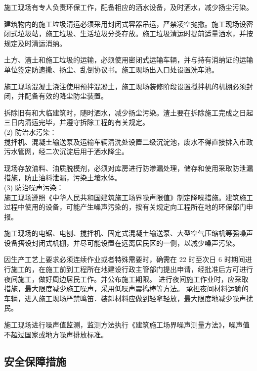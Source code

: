  施工现场有专人负责环保工作，配备相应的洒水设备，及时洒水，减少扬尘污染。  

 建筑物内的施工垃圾清运必须采用封闭式容器吊运，严禁凌空抛撒。施工现场设密闭式垃圾站，施工垃圾、生活垃圾分类存放。施工垃圾清运时提前适量洒水，并按规定及时清运消纳。  

 土方、渣土和施工垃圾的运输，必须使用密闭式运输车辆，并与持有消纳证的运输单位签定防遗撒、扬尘、乱倒协议书。施工现场出入口处设置洗车池。  

 施工现场混凝土浇注使用预拌混凝土，施工现场装修阶段设置搅拌机的机棚必须封闭，并配备有效的降尘防尘装置。  

 拆除旧有和大临建筑时，随时洒水，减少扬尘污染。渣土要在拆除施工完成之日起三日内清运完毕，并遵守拆除工程的有关规定。  \\

(2) 防治水污染：\\

 搅拌机、混凝土输送泵及运输车辆清洗处设置二级沉淀池，废水不得直接排入市政污水管网，经二次沉淀后用于洒水降尘。  

 现场存放油料、油质脱模剂，必须对库房进行防渗漏处理，储存和使用采取防泄漏措施，防止油料泄漏，污染土壤水体。\\

(3) 防治噪声污染：\\

 施工现场遵照《中华人民共和国建筑施工场界噪声限值》制定降噪措施。建筑施工过程中使用的设备，可能产生噪声污染的，按有关规定向工程所在地的环保部门申报。  

 施工现场的电锯、电刨、搅拌机、固定式混凝土输送泵、大型空气压缩机等强噪声设备搭设封闭式机棚，并尽可能设置在远离居民区的一侧，以减少噪声污染。  

 因生产工艺上要求必须连续作业或者特殊需要时，确需在 22 时至次日 6 时期间进行施工的，在施工前到工程所在地建设行政主管部门提出申请，经批准后方可进行夜间施工，做好周边居民工作。并公布施工期限。  进行夜间施工作业时，应采取措施，最大限度减少施工噪声，采用低噪声震捣棒等方法。
承担夜间材料运输的车辆，进入施工现场严禁鸣笛．装卸材料应做到轻拿轻放，最大限度地减少噪声扰民。  

 施工现场进行噪声值监测，监测方法执行《建筑施工场界噪声测量方法》，噪声值不超过国家或地方噪声排放标准。  

\subsection{安全保障措施}
